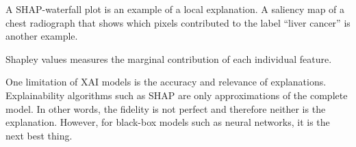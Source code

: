 A SHAP-waterfall plot is an example of a local explanation.
A saliency map of a chest radiograph that shows
which pixels contributed to the label \enquote{liver cancer}
is another example.

Shapley values measures the marginal contribution
of each individual feature.


One limitation of XAI models is the accuracy and relevance of explanations.
Explainability algorithms such as SHAP are only approximations
of the complete model.
In other words, the fidelity is not perfect and therefore neither
is the explanation.
However, for black-box models such as neural networks,
it is the next best thing.

